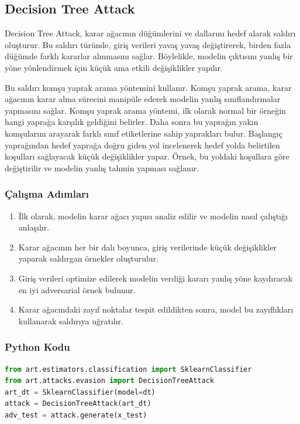 \newpage

\subsection{Decision Tree Attack}

Decision Tree Attack, karar ağacının düğümlerini ve dallarını hedef alarak saldırı oluşturur. Bu saldırı türünde, giriş verileri yavaş yavaş değiştirerek, birden fazla düğümde farklı kararlar alınmasını sağlar. Böylelikle, modelin çıktısını yanlış bir yöne yönlendirmek için küçük ama etkili değişiklikler yapılır.

Bu saldırı komşu yaprak arama yöntemini kullanır. Komşu yaprak arama, karar ağacının karar alma sürecini manipüle ederek modelin yanlış sınıflandırmalar yapmasını sağlar. Komşu yaprak arama yöntemi, ilk olarak normal bir örneğin hangi yaprağa karşılık geldiğini belirler. Daha sonra bu yaprağın yakın komşularını arayarak farklı sınıf etiketlerine sahip yaprakları bulur. Başlangıç yaprağından hedef yaprağa doğru giden yol incelenerek hedef yolda belirtilen koşulları sağlayacak küçük değişiklikler yapar. Örnek, bu yoldaki koşullara göre değiştirilir ve modelin yanlış tahmin yapması sağlanır.

\subsubsection{Çalışma Adımları}

\begin{enumerate}
    \item İlk olarak, modelin karar ağacı yapısı analiz edilir ve modelin nasıl çalıştığı anlaşılır.
    \item Karar ağacının her bir dalı boyunca, giriş verilerinde küçük değişiklikler yaparak saldırgan örnekler oluşturulur.
    \item Giriş verileri optimize edilerek modelin verdiği kararı yanlış yöne kaydıracak en iyi adversarial örnek bulunur.
    \item Karar ağacındaki zayıf noktalar tespit edildikten sonra, model bu zayıflıkları kullanarak saldırıya uğratılır.
\end{enumerate}

\subsubsection{Python Kodu}

\begin{lstlisting}[language=Python]
from art.estimators.classification import SklearnClassifier
from art.attacks.evasion import DecisionTreeAttack
art_dt = SklearnClassifier(model=dt)
attack = DecisionTreeAttack(art_dt)
adv_test = attack.generate(x_test)
\end{lstlisting}

